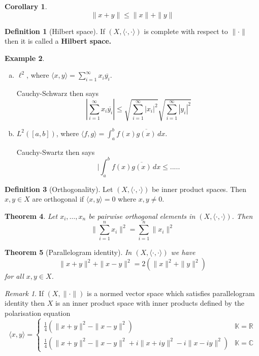 \documentclass[10pt, oneside, reqno]{amsbook}
\theoremstyle{plain}%
\newtheorem{thm}{Theorem}[section]
\newtheorem*{cor}{Corollary}
\theoremstyle{definition}
\newtheorem{defn}[thm]{Definition}
\newtheorem{exmp}[thm]{Example}
\theoremstyle{remark}
\newtheorem*{rem}{Remark}
\newcommand{\R}{\mathbb{R}}
\newcommand{\K}{\mathbb{K}}
\newcommand{\Com}{\mathbb{C}}
\begin{document}
\begin{cor}
    \[
        \| x + y \| \leq \| x \| + \| y \|
    \]
\end{cor}

\begin{defn}[Hilbert space]
    If $(X, \langle \cdot, \cdot \rangle)$ is complete with respect to $\| \cdot \|$ then it is called a \textbf{Hilbert space.} 
\end{defn}

\begin{exmp}
    \begin{enumerate}[(a)]
        \item $\ell^2$, where $\langle x, y \rangle = \sum_{i=1}^\infty x_i \overline{y_i}$.  
        
        Cauchy-Schwarz then says \[
            | \sum_{i=1}^\infty x_i \overline{y_i} | \leq \sqrt{ \sum_{i=1}^\infty |x_i|^2} \sqrt{\sum_{i=1}^\infty |y_i|^2}
        \]
        \item $L^2([a,b])$, where $\langle f, g \rangle = \int_a^b f(x) \overline{g(x)} \, dx$. 
        
        Cauchy-Swartz then says \[
            | \int_a^b f(x) \overline{ g(x)} \, dx \leq .....
        \]
    \end{enumerate}
\end{exmp}

\begin{defn}[Orthogonality]
    Let $(X, \langle \cdot , \cdot \rangle )$ be inner product spaces.  Then $x, y \in X $ are orthogonal if $\langle x, y \rangle = 0$ where $x, y \neq 0$.  
\end{defn}

\begin{thm}
    Let $x_i, \dots, x_n$ be pairwise orthogonal elements in $(X, \langle \cdot , \cdot \rangle)$.  Then \[
        \| \sum_{i=1}^n x_i \|^2 = \sum_{i=1}^n \|x_i\|^2
    \]
\end{thm}

\begin{thm}[Parallelogram identity]
    In $(X, \langle \cdot, \cdot \rangle)$ we have \[
         \| x+ y \|^2 + \| x-y \|^2 = 2( \| x \|^2 + \|y \|^2) \tag{$\star$}
    \] for all $x, y \in X$.
\end{thm}

\begin{rem}
    If $(X, \| \cdot \|)$ is a normed vector space which satisfies parallelogram identity then $X$ is an inner product space with inner products defined by the polarisation equation \[
    \langle x, y \rangle =  \begin{cases} 
            \frac{1}{4} \left( \| x + y \|^2 - \| x - y \|^2 \right)    & \K = \R \\
            \frac{1}{4}\left( \| x + y\|^2 - \| x - y \|^2 + i\| x + iy \|^2 - i\|x - iy\|^2 \right)                                                & \K = \Com
        \end{cases}
    \]
\end{rem}
\end{document}
